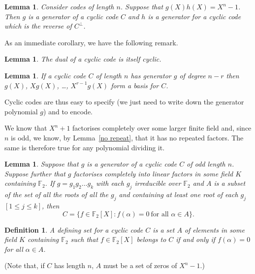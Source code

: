 \documentclass[12pt,a4paper]{article}
\theoremstyle{plain}
\newtheorem{lemma}[theorem]{Lemma}
\newtheorem{definition}[theorem]{Definition}
\theoremstyle{definition}
\begin{document}
    \begin{lemma}
        Consider codes of length $n$.
        Suppose that $g(X)h(X)=X^{n}-1$. Then $g$
        is a generator of a cyclic code $C$
        and $h$ is a generator for a cyclic code
        which is the reverse of $C^{\perp}$.
    \end{lemma}
    As an immediate corollary, we have the following
    remark.
    \begin{lemma}
        The dual of a cyclic code
        is itself cyclic.
    \end{lemma}
    \begin{lemma}
        \label{cyclic basis}
        If a cyclic code $C$ of length
        $n$ has generator $g$ of degree $n-r$ then
        $g(X)$, $Xg(X)$, \dots, $X^{r-1}g(X)$
        form a basis for $C$.
    \end{lemma}
    Cyclic codes are thus easy to specify
    (we just need to write down the generator
    polynomial $g$) and to encode.

    We know that $X^{n}+1$ factorises completely
    over some
    larger finite field and, since $n$ is odd,
    we know, by Lemma~\ref{no repeat},
    that it has no
    repeated factors. The same is therefore
    true for any polynomial dividing it.
    \begin{lemma}
        Suppose that $g$ is a
        generator of a cyclic code $C$ of
        odd length $n$. Suppose further
        that $g$ factorises
        completely into linear factors in some
        field $K$ containing ${\mathbb F}_{2}$.
        If $g=g_{1}g_{2}\dots g_{k}$ with each $g_{j}$ irreducible
        over ${\mathbb F}_{2}$
        and $A$ is a subset of the set of all the roots of
        all the $g_{j}$
        and containing at least one root
        of each $g_{j}$ $[1\leq j\leq k]$,
        then
        \[C=\{f\in {\mathbb F}_{2}[X]:f(\alpha)=0
        \ \text{for all $\alpha\in A$}\}.\]
    \end{lemma}
    \begin{definition}
        A \emph{defining set} for a cyclic
        code $C$ is a set $A$ of elements in some
        field $K$ containing ${\mathbb F}_{2}$
        such that $f\in{\mathbb F}_{2}[X]$ belongs
        to $C$ if and only if $f(\alpha)=0$
        for all $\alpha\in A$.
    \end{definition}
    \noindent
    (Note that, if $C$ has length $n$,
    $A$ must be a set of zeros
    of $X^{n}-1$.)
\end{document}
